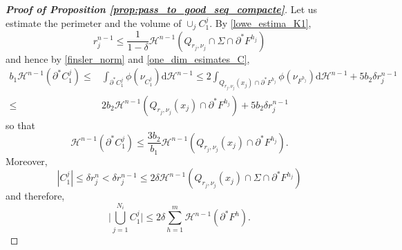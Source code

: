 \documentclass[reqno]{amsart}
\numberwithin{equation}{section}
\theoremstyle{plain}
\theoremstyle{definition}
\newcommand{\cH}{\mathcal{H}}
\newcommand{\p}{\partial}
\newcommand{\bound}{b}
\renewcommand{\d}{\mathrm{d}}
\begin{document}
\begin{proof}[\textbf{Proof of Proposition \ref{prop:pass_to_good_seq_compacte}}]
Let us estimate the perimeter and the volume of $\cup_j C_1^j.$ By \eqref{lowe_estima_K1},
\begin{equation}\label{rjn_1_estimates}
r_j^{n-1} \le \frac{1}{1-\delta}\cH^{n-1}(Q_{r_j,\nu_j}\cap \Sigma\cap \p^*F^{h_j}) 
\end{equation}
and hence  by \eqref{finsler_norm} and \eqref{one_dim_esimates_C},
\begin{align*}
\bound_1\cH^{n-1}(\p^*C_1^j) \le & \int_{\p^*C_1^j}\phi(\nu_{C_1^j})\d\cH^{n-1} \le 2 \int_{Q_{r_j,\nu_j}(x_j)\cap \p^*F^{h_j}} \phi(\nu_{F^{h_j}})\d\cH^{n-1} + 5\bound_2\delta r_j^{n-1} \\
\le & 2\bound_2 \cH^{n-1}(Q_{r_j,\nu_j}(x_j)\cap \p^*F^{h_j}) + 5\bound_2\delta r_j^{n-1} 
\end{align*}
so that
\begin{equation}
\cH^{n-1}(\p^*C_1^j) \le
\frac{3\bound_2}{\bound_1} \cH^{n-1}(Q_{r_j,\nu_j}(x_j) \cap \p^*F^{h_j}).
\label{per_C1j_ooopopo}
\end{equation}
% 
Moreover,
\begin{equation*}
|C_1^j|\le \delta r_j^n < \delta r_j^{n-1} \le 2\delta  \cH^{n-1}(Q_{r_j,\nu_j}(x_j)\cap \Sigma\cap \p^*F^{h_j})
\end{equation*}
and therefore,
\begin{equation}\label{tot_volest_K1}
\Big|\bigcup_{j=1}^{N_i} C_1^j\Big| \le 2\delta \sum\limits_{h=1}^{m}\cH^{n-1}(\p^*F^h).
\end{equation} 



\end{proof}
\end{document}
